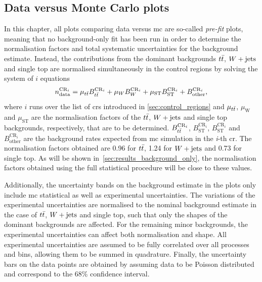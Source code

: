 \subsection{Data versus Monte Carlo plots}\label{sec:data_vs_mc}

In this chapter, all plots comparing data versus \gls{mc} are so-called \textit{pre-fit} plots, meaning that no background-only fit has been run in order to determine the normalisation factors and total systematic uncertainties for the background estimate.
Instead, the contributions from the dominant backgrounds $t\bar{t}$, $W+\mathrm{jets}$ and single top are normalised simultaneously in the control regions by solving the system of $i$ equations
\begin{equation}
		n_\mathrm{data}^{\mathrm{CR}_i} = \mu_{t\bar{t}} B_{t\bar{t}}^{\mathrm{CR}_i} + \mu_{W} B_{W}^{\mathrm{CR}_i} + \mu_\mathrm{ST} B_\mathrm{ST}^{\mathrm{CR}_i} + B_\mathrm{other}^{\mathrm{CR}_i},
\end{equation}
where $i$ runs over the list of \glspl{cr} introduced in \cref{sec:control_regions} and $\mu_{t\bar{t}}$, $\mu_\mathrm{W}$ and $\mu_\mathrm{ST}$ are the normalisation factors of the $t\bar{t}$, $W+\mathrm{jets}$ and single top backgrounds, respectively, that are to be determined.
$B_{t\bar{t}}^{\mathrm{CR}_i}$, $B_\mathrm{ST}^{\mathrm{CR}_i}$, $B_\mathrm{ST}^{\mathrm{CR}_i}$ and $B_\mathrm{other}^{\mathrm{CR}_i}$ are the background rates expected from \gls{mc} simulation in the \textit{i}-th \gls{cr}.
The normalisation factors obtained are 0.96 for $t\bar{t}$, 1.24 for $W+\mathrm{jets}$ and 0.73 for single top. As will be shown in~\cref{sec:results_background_only}, the normalisation factors obtained using the full statistical procedure will be close to these values.

Additionally, the uncertainty bands on the background estimate in the plots only include \gls{mc} statistical as well as experimental uncertainties.
The variations of the experimental uncertainties are normalised to the nominal background estimate in the case of $t\bar{t}$, $W+\mathrm{jets}$ and single top, such that only the shapes of the dominant backgrounds are affected.
For the remaining minor backgrounds, the experimental uncertainties can affect both normalisation and shape.
All experimental uncertainties are assumed to be fully correlated over all processes and bins, allowing them to be summed in quadrature.
Finally, the uncertainty bars on the data points are obtained by assuming data to be Poisson distributed and correspond to the 68\% confidence interval. 


